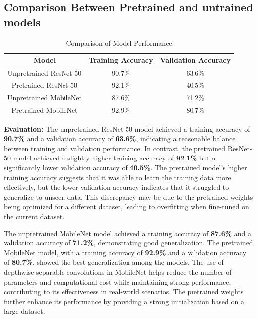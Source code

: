 \documentclass[12pt]{article}
\begin{document}
\subsection*{Comparison Between Pretrained and untrained models}

\begin{table}[ht]
    \centering
    \begin{tabular}{|c|c|c|}
        \hline
        \textbf{Model} & \textbf{Training Accuracy} & \textbf{Validation Accuracy} \\
        \hline
        Unpretrained ResNet-50 & 90.7\% & 63.6\% \\
        \hline
        Pretrained ResNet-50 & 92.1\% & 40.5\% \\
        \hline
        Unpretrained MobileNet & 87.6\% & 71.2\% \\
        \hline
        Pretrained MobileNet & 92.9\% & 80.7\% \\
        \hline
    \end{tabular}
    \caption{Comparison of Model Performance}
    \label{tab:model_comparison}
\end{table}

\textbf{Evaluation:} The unpretrained ResNet-50 model achieved a training accuracy of \textbf{90.7\%} and a validation accuracy of \textbf{63.6\%}, indicating a reasonable balance between training and validation performance. In contrast, the pretrained ResNet-50 model achieved a slightly higher training accuracy of \textbf{92.1\%} but a significantly lower validation accuracy of \textbf{40.5\%}. The pretrained model's higher training accuracy suggests that it was able to learn the training data more effectively, but the lower validation accuracy indicates that it struggled to generalize to unseen data. This discrepancy may be due to the pretrained weights being optimized for a different dataset, leading to overfitting when fine-tuned on the current dataset. 

The unpretrained MobileNet model achieved a training accuracy of \textbf{87.6\%} and a validation accuracy of \textbf{71.2\%}, demonstrating good generalization. The pretrained MobileNet model, with a training accuracy of \textbf{92.9\%} and a validation accuracy of \textbf{80.7\%}, showed the best generalization among the models. The use of depthwise separable convolutions in MobileNet helps reduce the number of parameters and computational cost while maintaining strong performance, contributing to its effectiveness in real-world scenarios. The pretrained weights further enhance its performance by providing a strong initialization based on a large dataset.
\end{document}

